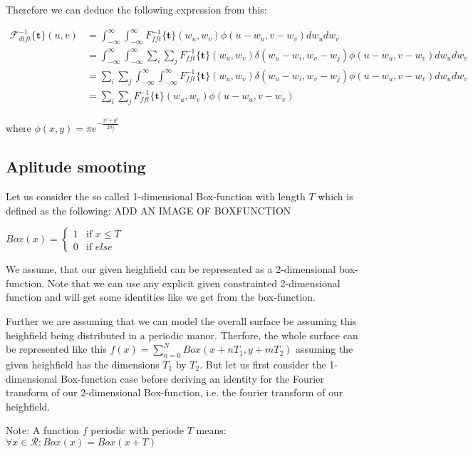 Therefore we can deduce the following expression from this:

\begin{align*}
\mathcal{F}_{dtft}^{-1}\{\mathbf{t}\}(u,v)
& = \int_{-\infty}^{\infty} \int_{-\infty}^{\infty} {F}_{fft}^{-1}\{\mathbf{t}\}(w_u,w_v) \phi(u-w_u, v-w_v) dw_u dw_v \\
& = \int_{-\infty}^{\infty} \int_{-\infty}^{\infty} \sum_i \sum_j {F}_{fft}^{-1}\{\mathbf{t}\}(w_u,w_v) \delta(w_u-w_i, w_v-w_j)\phi(u-w_u, v-w_v) dw_u dw_v \\
& = \sum_i \sum_j \int_{-\infty}^{\infty} \int_{-\infty}^{\infty}  {F}_{fft}^{-1}\{\mathbf{t}\}(w_u,w_v) \delta(w_u-w_i, w_v-w_j)\phi(u-w_u, v-w_v) dw_u dw_v \\
& = \sum_i \sum_j {F}_{fft}^{-1}\{\mathbf{t}\}(w_u,w_v) \phi(u-w_u, v-w_v)
\end{align*}

where $\phi(x,y) = \pi e^{-\frac{x^2 + y^2}{2\sigma_{f}^2}}$

\subsection{Aplitude smooting}
Let us consider the so called 1-dimensional Box-function with length $T$ which is defined as the following: 
ADD AN IMAGE OF BOXFUNCTION

$
Box(x) =
\left\{
	\begin{array}{ll}
		1  & \mbox{if } x \leq T \\
		0 & \mbox{if } else
	\end{array}
\right.
$

We assume, that our given heighfield can be represented as a 2-dimensional box-function. 
Note that we can use any explicit given constrainted 2-dimensional function and will get some identities like
we get from the box-function.
 
Further we are assuming that we can model the overall surface be assuming this heighfield being distributed in a periodic manor.
Therfore, the whole surface can be represented like this $f(x) = \sum_{n=0}^{N} Box(x+nT_1, y+mT_2)$ assuming the given heighfield has the dimensions $T_1$ by $T_2$. But let us first consider the 1-dimensional Box-function case before deriving an identity for the Fourier transform of our 2-dimensional Box-function, i.e. the fourier transform of our heighfield. 

Note: A function $f$ periodic with periode $T$ means: $\forall x \in \mathcal{R}: Box(x) = Box(x+T)$

